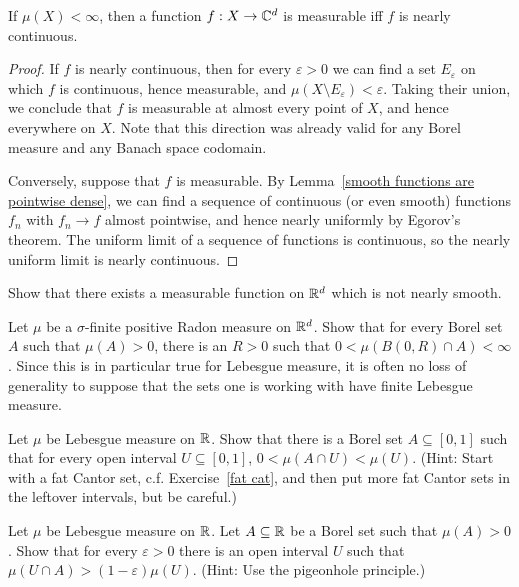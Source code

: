 \begin{theorem}[Luzin]
If $\mu(X) < \infty$, then a function $f: X \to \mathbb{C}^d$ is measurable iff $f$ is nearly continuous.
\end{theorem}
\begin{proof}
If $f$ is nearly continuous, then for every $\varepsilon > 0$ we can find a set $E_\varepsilon$ on which $f$ is continuous, hence measurable, and $\mu(X \setminus E_\varepsilon) < \varepsilon$.
Taking their union, we conclude that $f$ is measurable at almost every point of $X$, and hence everywhere on $X$.
Note that this direction was already valid for any Borel measure and any Banach space codomain.

Conversely, suppose that $f$ is measurable.
By Lemma~\ref{smooth functions are pointwise dense}, we can find a sequence of continuous (or even smooth) functions $f_{n}$ with $f_{n} \to f$ almost pointwise, and hence nearly uniformly by Egorov's theorem.
The uniform limit of a sequence of functions is continuous, so the nearly uniform limit is nearly continuous.
\end{proof}

\begin{exercise}
Show that there exists a measurable function on $\mathbb{R}^d$ which is not nearly smooth.
\end{exercise}

\begin{exercise}
Let $\mu$ be a $\sigma$-finite positive Radon measure on $\mathbb{R}^d$.
Show that for every Borel set $A$ such that $\mu(A) > 0$, there is an $R > 0$ such that $0 < \mu(B(0, R) \cap A) < \infty$.
Since this is in particular true for Lebesgue measure, it is often no loss of generality to suppose that the sets one is working with have finite Lebesgue measure.
\end{exercise}

\begin{exercise}
Let $\mu$ be Lebesgue measure on $\mathbb{R}$.
Show that there is a Borel set $A \subseteq [0, 1]$ such that for every open interval $U \subseteq [0, 1]$, $0 < \mu(A \cap U) < \mu(U)$.
(Hint: Start with a fat Cantor set, c.f. Exercise~\ref{fat cat}, and then put more fat Cantor sets in the leftover intervals, but be careful.)
\end{exercise}

\begin{exercise}
Let $\mu$ be Lebesgue measure on $\mathbb{R}$.
Let $A \subseteq \mathbb{R}$ be a Borel set such that $\mu(A) > 0$.
Show that for every $\varepsilon > 0$ there is an open interval $U$ such that $\mu(U \cap A) > (1 - \varepsilon)\mu(U)$.
(Hint: Use the pigeonhole principle.)
\end{exercise}

